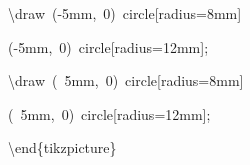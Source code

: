 {{\rule[-0.5ex]{0pt}{2.5ex}\hspace*{1.0em}\textbackslash{}draw~({-}5mm,~0)~circle[radius=8mm]\\
\rule[-0.5ex]{0pt}{2.5ex}\hspace*{4.0em}({-}5mm,~0)~circle[radius=12mm];\\
\rule[-0.5ex]{0pt}{2.5ex}\hspace*{1.0em}\textbackslash{}draw~(~5mm,~0)~circle[radius=8mm]\\
\rule[-0.5ex]{0pt}{2.5ex}\hspace*{4.0em}(~5mm,~0)~circle[radius=12mm];\\
\rule[-0.5ex]{0pt}{2.5ex}\hspace*{0.0em}\textbackslash{}end\{tikzpicture\}}%
}%
\endgroup
